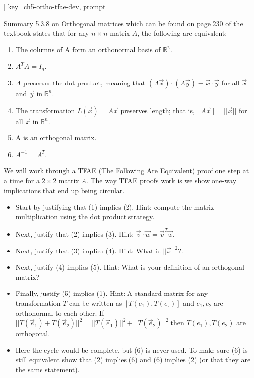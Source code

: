 
\begin{SaveQuestion}[
        key=ch5-ortho-tfae-dev,
        prompt={Summary 5.3.8 on Orthogonal matrices which can be found on page 230 of the textbook states that for any $n \times n$ matrix $A$, the following are equivalent:\begin{enumerate}
    \item The columns of A form an orthonormal basis of $\mathbb{R}^n$.
    \item $A^TA=I_n$.
    \item $A$ preserves the dot product, meaning that $(A \vec x) \cdot (A \vec y) = \vec x \cdot \vec y$ for all $\vec x$ and $\vec y$ in $\mathbb{R}^n$.
    \item The transformation $L(\vec x) = A \vec x$ preserves length; that is, $|| A \vec x || = ||\vec x ||$ for all $\vec x$ in $\mathbb{R}^n$.
    \item A is an orthogonal matrix.
    \item $A^{-1}=A^T$.  
\end{enumerate}
We will work through a TFAE (The Following Are Equivalent) proof one step at a time for a $2 \times 2$ matrix $A$. The way TFAE proofs work is we show one-way implications that end up being circular. 
\begin{itemize}
    \item Start by justifying that (1) implies (2). Hint: compute the matrix multiplication using the dot product strategy. 
    \item Next, justify that (2) implies (3). Hint: $\vec v \cdot \vec w = \vec v ^T \vec w$. 
    \item Next, justify that (3) implies (4). Hint: What is $||\vec x ||^2$?. 
    \item Next, justify (4) implies (5). Hint: What is your definition of an orthogonal matrix? 
    \item Finally, justify (5) implies (1). Hint: A standard matrix for any transformation $T$ can be written as $[T(e_1),T(e_2)]$ and $e_1,e_2$ are orthonormal to each other. If $||T(\vec e_1) + T(\vec e_2)||^2 = ||T(\vec e_1)||^2 + ||T(\vec e_2)||^2$ then $T(e_1),T(e_2)$ are orthogonal. 
    \item Here the cycle would be complete, but (6) is never used. To make sure (6) is still equivalent show that (2) implies (6) and (6) implies (2) (or that they are the same statement).

\end{itemize}}
\end{SaveQuestion}
